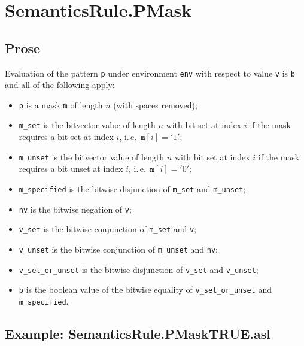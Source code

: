 \documentclass{book}
\begin{document}

\section{SemanticsRule.PMask \label{sec:SemanticsRule.PMask}}

    \subsection{Prose}
    Evaluation of the pattern \texttt{p} under environment \texttt{env} with
    respect to value \texttt{v} is \texttt{b} and all of the following apply:
    \begin{itemize}
      \item \texttt{p} is a mask \texttt{m} of length $n$ (with spaces removed);
      \item \texttt{m\_set} is the bitvector value of length $n$ with bit set
        at index $i$ if the mask requires a bit set at index $i$, i.\,e.\
        $\texttt{m}[i] = '1'$;
      \item \texttt{m\_unset} is the bitvector value of length $n$ with bit set
        at index $i$ if the mask requires a bit unset at index $i$, i.\,e.\
        $\texttt{m}[i] = '0'$;
      \item \texttt{m\_specified} is the bitwise disjunction of \texttt{m\_set}
        and \texttt{m\_unset};
      \item \texttt{nv} is the bitwise negation of \texttt{v};
      \item \texttt{v\_set} is the bitwise conjunction of \texttt{m\_set} and
        \texttt{v};
      \item \texttt{v\_unset} is the bitwise conjunction of \texttt{m\_unset} and
        \texttt{nv};
      \item \texttt{v\_set\_or\_unset} is the bitwise disjunction of
        \texttt{v\_set} and \texttt{v\_unset};
      \item \texttt{b} is the boolean value of the bitwise equality of
        \texttt{v\_set\_or\_unset} and \texttt{m\_specified}.
    \end{itemize}

    \subsection{Example: SemanticsRule.PMaskTRUE.asl}
\end{document}
